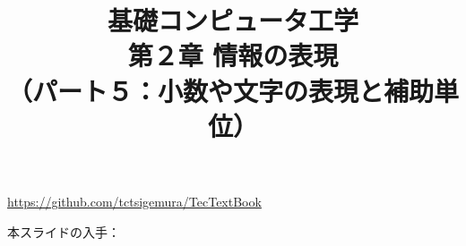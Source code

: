\documentclass[handout]{beamer}        %
\begin{document}
\title{基礎コンピュータ工学\\第２章 情報の表現\\
       （パート５：小数や文字の表現と補助単位）}
\date{}

\begin{frame}
  \titlepage
  \centerline{\url{https://github.com/tctsigemura/TecTextBook}}
  \vfill
  \centerline{本スライドの入手：
    }
\end{frame}

\end{document}
